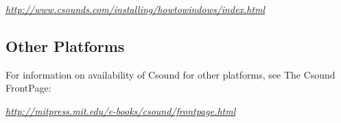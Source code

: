   \emph{\url{http://www.csounds.com/installing/howtowindows/index.html}}
 
\subsection*{Other Platforms}


  For information on availability of Csound for other platforms, see The Csound FrontPage: 


  \emph{\url{http://mitpress.mit.edu/e-books/csound/frontpage.html}}
 


\begin{comment}
\begin{tabular}{lcr}
Previous &Home &Next \\
Introduction &Up &The Csound Mailing List

\end{tabular}



\end{comment}

